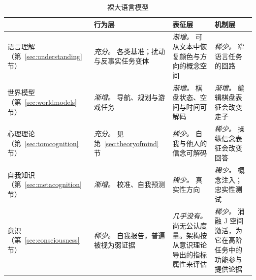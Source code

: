 \begin{table}
\tiny
\begin{subtable}{\textwidth}
\begin{tabularx}{\linewidth}{@{}p{2.1cm}XXX@{}}
\toprule
 & \textbf{行为层} & \textbf{表征层} & \textbf{机制层} \\
\midrule
语言理解（第~\ref{sec:understanding} 节） &
\emph{充分。} 各类基准；扰动与反事实任务变体 \citep{wu2024reasoning} &
\emph{渐增。} 可从文本中恢复颜色与方向的概念空间 \citep{abdou2021language, patel2022mapping} &
\emph{稀少。} 窄语言任务的回路 \citep{wang2022interpretability} \\
\addlinespace
世界模型（第~\ref{sec:worldmodels} 节） &
\emph{渐增。} 导航、规划与游戏任务 \citep{momennejad2023cogeval, paglieri2024balrog} &
\emph{渐增。} 棋盘状态、空间与时间可解码 \citep{li2023emergent, gurnee2024language} &
\emph{渐增。} 编辑棋盘表征会改变走子 \citep{li2023emergent, nanda2023emergent} \\
\addlinespace
心理理论（第~\ref{sec:tomcognition} 节） &
\emph{充分。} 见第~\ref{sec:theoryofmind} 节 &
\emph{稀少。} 自我与他人的信念可解码 \citep{zhu2024language, bortoletto2024benchmarking} &
\emph{稀少。} 操纵信念表征会改变回答 \citep{zhu2024language} \\
\addlinespace
自我知识（第~\ref{sec:metacognition} 节） &
\emph{渐增。} 校准、自我预测 \citep{kadavath2022language, binder2024looking} &
\emph{稀少。} 真实性方向 \citep{azaria2023internal, burns2023discovering} &
\emph{稀少。} 概念注入；忠实性测试 \citep{lindsey2025introspection, turpin2023language} \\
\addlinespace
意识（第~\ref{sec:consciousness} 节） &
\emph{稀少。} 自我报告，普遍被视为弱证据 \citep{perez2023towards} &
\emph{几乎没有。} 尚无公认度量。架构按从意识理论导出的指标属性来评估 \citep{butlin2023consciousness} &
\emph{稀少。} 消融 J 空间激活，为它在高阶任务中的功能参与提供论据 \citep{gurnee2026verbalize}\\
\bottomrule
\end{tabularx}
\caption{裸大语言模型}\label{tab:levels-bare}
\end{subtable}

\bigskip


\end{table}
